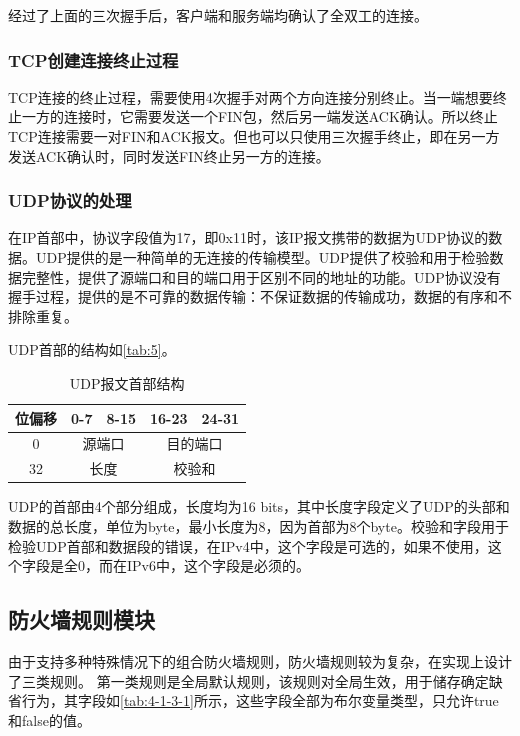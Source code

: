 \documentclass[format=final, language=chinese, degree=fyp]{hustthesis}
\begin{document}
经过了上面的三次握手后，客户端和服务端均确认了全双工的连接。


\subsubsection{TCP创建连接终止过程}

TCP连接的终止过程，需要使用4次握手对两个方向连接分别终止。当一端想要终止一方的连接时，它需要发送一个FIN包，然后另一端发送ACK确认。所以终止TCP连接需要一对FIN和ACK报文。但也可以只使用三次握手终止，即在另一方发送ACK确认时，同时发送FIN终止另一方的连接。

\subsubsection{UDP协议的处理}
在IP首部中，协议字段值为17，即0x11时，该IP报文携带的数据为UDP协议的数据。UDP提供的是一种简单的无连接的传输模型。UDP提供了校验和用于检验数据完整性，提供了源端口和目的端口用于区别不同的地址的功能。UDP协议没有握手过程，提供的是不可靠的数据传输：不保证数据的传输成功，数据的有序和不排除重复。

    
UDP首部的结构如\autoref{tab:5}。

\begin{table}[h!]
\centering
\caption{UDP报文首部结构}\label{tab:5}
\begin{tabular}{|c|c|c|c|c|}
	\hline
	位偏移 & 0-7 & 8-15 & 16-23 & 24-31\\\hline
	0 & \multicolumn{2}{c|}{源端口} & \multicolumn{2}{c|}{目的端口} \\\hline
	32 & \multicolumn{2}{c|}{长度} & \multicolumn{2}{c|}{校验和} \\\hline
	\end{tabular}
\end{table}

UDP的首部由4个部分组成，长度均为16 bits，其中长度字段定义了UDP的头部和数据的总长度，单位为byte，最小长度为8，因为首部为8个byte。校验和字段用于检验UDP首部和数据段的错误，在IPv4中，这个字段是可选的，如果不使用，这个字段是全0，而在IPv6中，这个字段是必须的。

\subsection{防火墙规则模块}

由于支持多种特殊情况下的组合防火墙规则，防火墙规则较为复杂，在实现上设计了三类规则。
第一类规则是全局默认规则，该规则对全局生效，用于储存确定缺省行为，其字段如\autoref{tab:4-1-3-1}所示，这些字段全部为布尔变量类型，只允许true和false的值。
\end{document}

